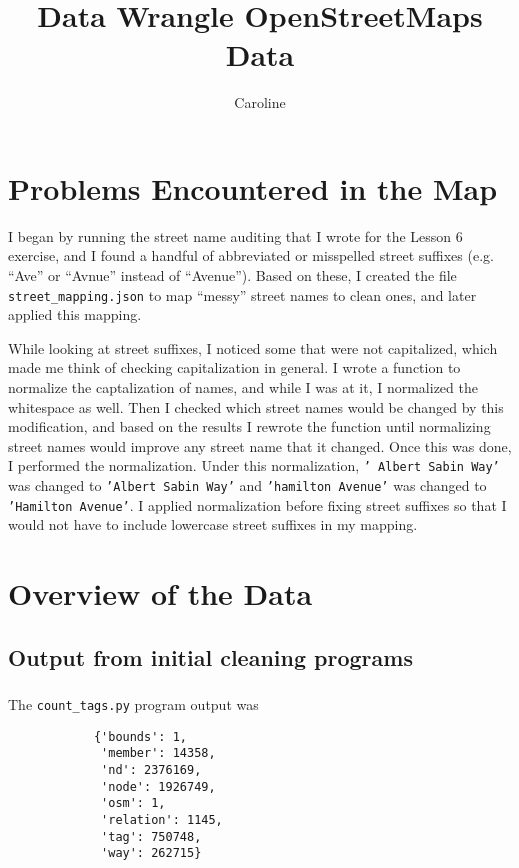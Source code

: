 \documentclass{article}
\author{Caroline}
\title{Data Wrangle OpenStreetMaps Data}
\begin{document}
    \maketitle
    \section{Problems Encountered in the Map}
        I began by running the street name auditing that I wrote for the Lesson
        6 exercise, and I found a handful of abbreviated or misspelled street
        suffixes (e.g. ``Ave'' or ``Avnue'' instead of ``Avenue''). Based on
        these, I created the file \texttt{street\_mapping.json} to map ``messy''
        street names to clean ones, and later applied this mapping.

        While looking at street suffixes, I noticed some that were not
        capitalized, which made me think of checking capitalization in general.
        I wrote a function to normalize the captalization of names, and while I
        was at it, I normalized the whitespace as well. Then I checked which
        street names would be changed by this modification, and based on the
        results I rewrote the function until normalizing street names would
        improve any street name that it changed. Once this was done, I performed
        the normalization. Under this normalization, \texttt{' Albert Sabin
        Way'} was changed to \texttt{'Albert Sabin Way'} and \texttt{'hamilton
        Avenue'} was changed to \texttt{'Hamilton Avenue'}. I applied
        normalization before fixing street suffixes so that I would not have to
        include lowercase street suffixes in my mapping.

    \section{Overview of the Data}
        \subsection{Output from initial cleaning programs}
            \subsubsection{}
            The \texttt{count\_tags.py} program output was
            \begin{lstlisting}
            {'bounds': 1,
             'member': 14358,
             'nd': 2376169,
             'node': 1926749,
             'osm': 1,
             'relation': 1145,
             'tag': 750748,
             'way': 262715}
            \end{lstlisting}
\end{document}
